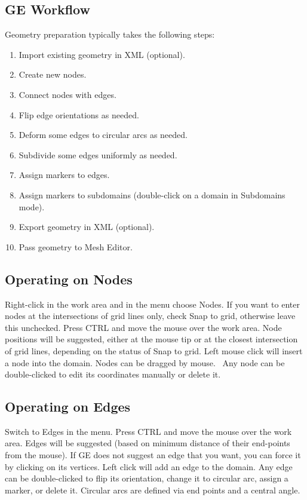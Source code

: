 \documentclass{article}
\begin{document}
\subsection*{GE Workflow}

Geometry preparation typically takes the following steps: 
\begin{enumerate}
\item Import existing geometry in XML (optional).
\item Create new nodes.
\item Connect nodes with edges. 
\item Flip edge orientations as needed.
\item Deform some edges to circular arcs as needed.
\item Subdivide some edges uniformly as needed.
\item Assign markers to edges.
\item Assign markers to subdomains (double-click on a domain in Subdomains mode).
\item Export geometry in XML (optional).
\item Pass geometry to Mesh Editor.
\end{enumerate}

\subsection*{Operating on Nodes}

Right-click in the work area and in the menu choose Nodes. If you want to enter nodes at the intersections of grid lines only, check Snap to grid, otherwise leave this unchecked. Press CTRL and move the mouse over the work area. Node positions will be suggested, either at the mouse tip or at the closest intersection of grid lines, depending on the status of Snap to grid. Left mouse click will insert a node into the domain. Nodes can be dragged by mouse.  Any node can be double-clicked to edit its coordinates manually or delete it.

\subsection*{Operating on Edges}

Switch to Edges in the menu. Press CTRL and move the mouse over the work area. Edges will be suggested (based on minimum distance of their end-points from the mouse). If GE does not suggest an edge that you want, you can force it by clicking on its vertices. Left click will add an edge to the domain. Any edge can be double-clicked to flip its orientation, change it to circular arc, assign a marker, or delete it. Circular arcs are defined via end points and a central angle. 
\end{document}
